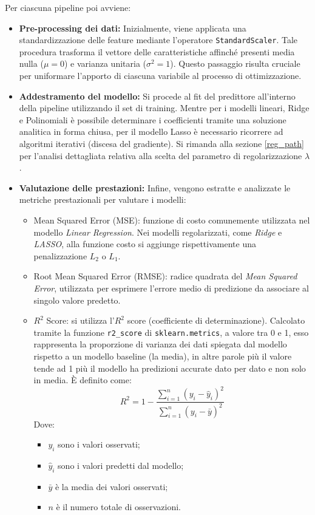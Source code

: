 \documentclass[a4paper,11pt]{article}
\begin{document}
Per ciascuna pipeline poi avviene:
\begin{itemize}
    \item \textbf{Pre-processing dei dati:} Inizialmente, viene applicata una standardizzazione delle feature mediante l'operatore \texttt{StandardScaler}. Tale procedura trasforma il vettore delle caratteristiche affinché presenti media nulla ($\mu = 0$) e varianza unitaria ($\sigma^2 = 1$). Questo passaggio risulta cruciale per uniformare l'apporto di ciascuna variabile al processo di ottimizzazione.
    \item \textbf{Addestramento del modello:} Si procede al fit del predittore all'interno della pipeline utilizzando il set di training. Mentre per i modelli lineari, Ridge e Polinomiali è possibile determinare i coefficienti tramite una soluzione analitica in forma chiusa, per il modello Lasso è necessario ricorrere ad algoritmi iterativi (discesa del gradiente). Si rimanda alla sezione \ref{reg_path} per l'analisi dettagliata relativa alla scelta del parametro di regolarizzazione $\lambda$.
    \item \textbf{Valutazione delle prestazioni:} Infine, vengono estratte e analizzate le metriche prestazionali per valutare i modelli:
    \begin{itemize}
        \item Mean Squared Error (MSE): funzione di costo comunemente utilizzata nel modello \textit{Linear Regression}. Nei modelli regolarizzati, come \textit{Ridge} e \textit{LASSO}, alla funzione costo si aggiunge rispettivamente una penalizzazione \(L_2\) o \(L_1\).
        \item Root Mean Squared Error (RMSE): radice quadrata del \textit{Mean Squared Error}, utilizzata per esprimere l’errore medio di predizione da associare al singolo valore predetto.
        \item $R^2$ Score: si utilizza l'$R^2$ score (coefficiente di determinazione). Calcolato tramite la funzione \texttt{r2\_score} di \texttt{sklearn.metrics}, a valore tra 0 e 1, esso rappresenta la proporzione di varianza dei dati spiegata dal modello rispetto a un modello baseline (la media), in altre parole più il valore tende ad 1 più il modello ha predizioni accurate dato per dato e non solo in media. È definito come:
    \begin{equation}
    R^2 = 1 - \frac{\sum_{i=1}^{n} (y_i - \hat{y}_i)^2}{\sum_{i=1}^{n} (y_i - \bar{y})^2}
    \end{equation}
    Dove:
    \begin{itemize}
    \footnotesize
        \item $y_i$ sono i valori osservati;
        \item $\hat{y}_i$ sono i valori predetti dal modello;
        \item $\bar{y}$ è la media dei valori osservati;
        \item $n$ è il numero totale di osservazioni.
    \end{itemize}
    \end{itemize}
\end{itemize}
\end{document}

